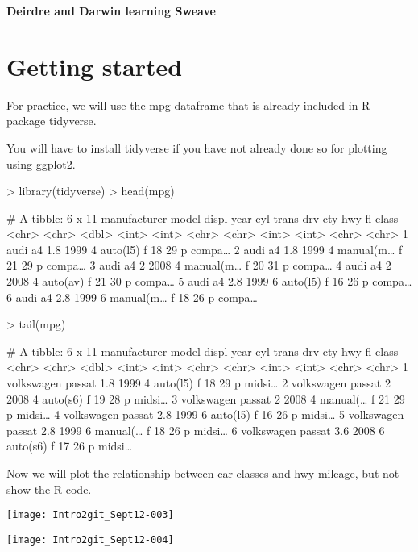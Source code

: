 \documentclass{article}
\begin{document}


\noindent \textbf{\Large{Deirdre and Darwin learning Sweave}}
\author{Deirdre & Darwin }

\section {Getting started}
\newline 

For practice, we will use the mpg dataframe that is already included in R package tidyverse. 

You will have to install tidyverse if you have not already done so for plotting using ggplot2.

\begin{Schunk}
\begin{Sinput}
> library(tidyverse)
> head(mpg)
\end{Sinput}
\begin{Soutput}
# A tibble: 6 x 11
  manufacturer model displ  year   cyl trans     drv     cty   hwy fl    class 
  <chr>        <chr> <dbl> <int> <int> <chr>     <chr> <int> <int> <chr> <chr> 
1 audi         a4      1.8  1999     4 auto(l5)  f        18    29 p     compa…
2 audi         a4      1.8  1999     4 manual(m… f        21    29 p     compa…
3 audi         a4      2    2008     4 manual(m… f        20    31 p     compa…
4 audi         a4      2    2008     4 auto(av)  f        21    30 p     compa…
5 audi         a4      2.8  1999     6 auto(l5)  f        16    26 p     compa…
6 audi         a4      2.8  1999     6 manual(m… f        18    26 p     compa…
\end{Soutput}
\end{Schunk}

\begin{Schunk}
\begin{Sinput}
> tail(mpg)
\end{Sinput}
\begin{Soutput}
# A tibble: 6 x 11
  manufacturer model  displ  year   cyl trans    drv     cty   hwy fl    class 
  <chr>        <chr>  <dbl> <int> <int> <chr>    <chr> <int> <int> <chr> <chr> 
1 volkswagen   passat   1.8  1999     4 auto(l5) f        18    29 p     midsi…
2 volkswagen   passat   2    2008     4 auto(s6) f        19    28 p     midsi…
3 volkswagen   passat   2    2008     4 manual(… f        21    29 p     midsi…
4 volkswagen   passat   2.8  1999     6 auto(l5) f        16    26 p     midsi…
5 volkswagen   passat   2.8  1999     6 manual(… f        18    26 p     midsi…
6 volkswagen   passat   3.6  2008     6 auto(s6) f        17    26 p     midsi…
\end{Soutput}
\end{Schunk}

Now we will plot the relationship between car classes and hwy mileage, but not show the R code.

\texttt{[image: Intro2git\_Sept12-003]}

\texttt{[image: Intro2git\_Sept12-004]}
\end{document}
